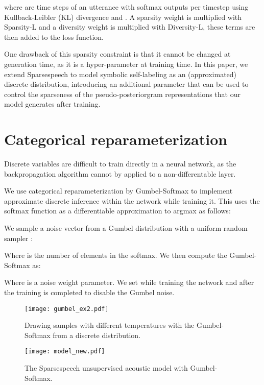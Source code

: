 \documentclass[a4paper]{article}
\begin{document}
where  are time steps of an utterance with  softmax outputs per timestep using Kullback-Leibler (KL) divergence \cite{kullback1951information} and . A sparsity weight is multiplied with Sparsity-L and a diversity weight is multiplied with Diversity-L, these terms are then added to the loss function.

One drawback of this sparsity constraint is that it cannot be changed at generation time, as it is a hyper-parameter at training time. In this paper, we extend Sparsespeech to model symbolic self-labeling as an (approximated) discrete distribution, introducing an additional parameter that can be used to control the sparseness of the pseudo-posteriorgram representations that our model generates after training.



\section{Categorical reparameterization}

Discrete variables are difficult to train directly in a neural network, as the backpropagation algorithm cannot by applied to a non-differentable layer.

We use categorical reparameterization \cite{jang2017categorical} by Gumbel-Softmax \cite{gumbel1948statistical} to implement approximate discrete inference within the network while training it. This uses the softmax function as a differentiable approximation to argmax as follows: 

We sample a noise vector  from a Gumbel distribution with a uniform random sampler :



Where  is the number of elements in the softmax. We then compute the Gumbel-Softmax as:



Where  is a noise weight parameter. We set  while training the network and  after the training is completed to disable the Gumbel noise.

\begin{figure}[t]
  \centering
  \texttt{[image: gumbel\_ex2.pdf]}
  \caption{Drawing samples with different temperatures with the Gumbel-Softmax from a discrete distribution.}
  \label{fig:gumbel_ex}
\end{figure}

\begin{figure}[t]
  \centering
  \texttt{[image: model\_new.pdf]}
  \caption{The Sparsespeech unsupervised acoustic model with Gumbel-Softmax.}
  \label{fig:model}
\end{figure}
\end{document}
